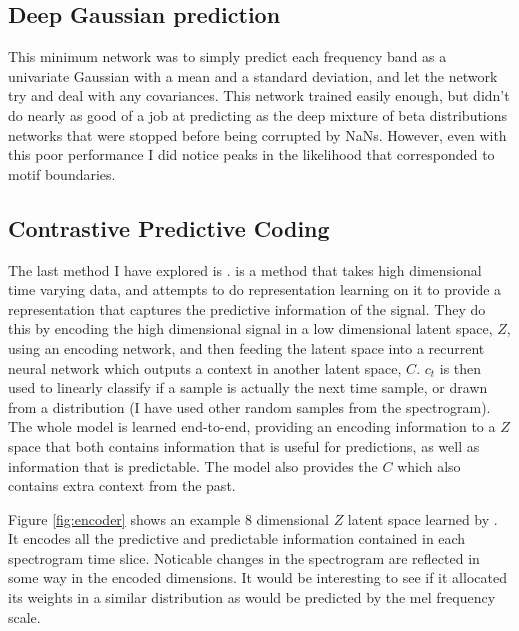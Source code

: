 \subsection{Deep Gaussian prediction}
This minimum network was to simply predict each frequency band as a univariate Gaussian with a mean and a standard deviation, and let the network try and deal with any covariances. This network trained easily enough, but didn't do nearly as good of a job at predicting as the deep mixture of beta distributions networks that were stopped before being corrupted by NaNs. However, even with this poor performance I did notice peaks in the likelihood that corresponded to motif boundaries.

\subsection{Contrastive Predictive Coding}
The last method I have explored is \CPC\cite{CPC}. \CPC is a method that takes high dimensional time varying data, and attempts to do representation learning on it to provide a representation that captures the predictive information of the signal. They do this by encoding the high dimensional signal in a low dimensional latent space, $Z$, using an encoding network, and then feeding the latent space into a recurrent neural network which outputs a context in another latent space, $C$. $c_t$ is then used to linearly classify if a sample is actually the next time sample, or drawn from a distribution (I have used other random samples from the spectrogram). The whole model is learned end-to-end, providing an encoding information to a $Z$ space that both contains information that is useful for predictions, as well as information that is predictable. The model also provides the $C$ which also contains extra context from the past.

Figure \ref{fig:encoder} shows an example 8 dimensional $Z$ latent space learned by \CPC. It encodes all the predictive and predictable information contained in each spectrogram time slice. Noticable changes in the spectrogram are reflected in some way in the encoded dimensions. It would be interesting to see if it allocated its weights in a similar distribution as would be predicted by the mel frequency scale.

